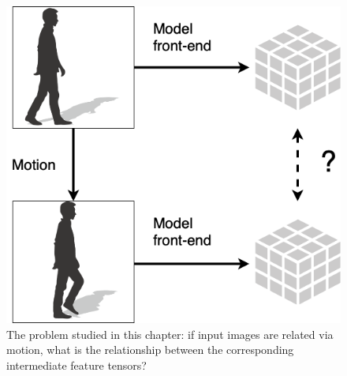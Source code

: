 \begin{figure}[htbp]
    \centering
    \includegraphics[width=0.6\linewidth]{img/video_latent_space_motion_analysis/motion_problem.png}
    \caption[Overview of motion problem]{%
        The problem studied in this chapter: if input images are related via motion, what is the relationship between the corresponding intermediate feature tensors?
    }
    \label{fig:video_latent_space_motion_analysis/overview}
\end{figure}


